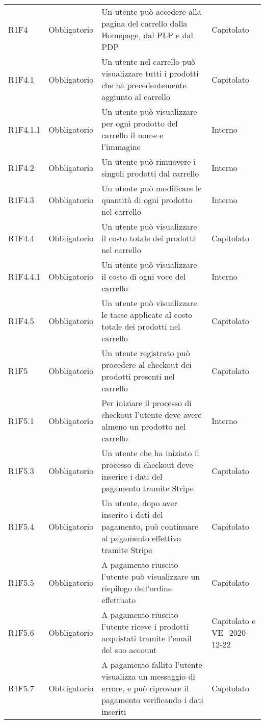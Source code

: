 {\begin{longtable}{C{2.5cm} C{2.8cm} C{6.7cm} C{2.5cm}}
R1F4 & Obbligatorio & Un utente può accedere alla pagina del carrello dalla Homepage, dal PLP e dal PDP & Capitolato \\
R1F4.1 & Obbligatorio & Un utente nel carrello può visualizzare tutti i prodotti che ha precedentemente aggiunto al carrello & Capitolato \\
R1F4.1.1 & Obbligatorio & Un utente può visualizzare per ogni prodotto del carrello il nome e l'immagine & Interno \\
R1F4.2 & Obbligatorio & Un utente può rimuovere i singoli prodotti dal carrello & Interno \\
R1F4.3 & Obbligatorio & Un utente può modificare le quantità di ogni prodotto nel carrello & Interno \\
R1F4.4 & Obbligatorio & Un utente può visualizzare il costo totale dei prodotti nel carrello & Capitolato \\
R1F4.4.1 & Obbligatorio & Un utente può visualizzare il costo di ogni voce del carrello & Interno \\
R1F4.5 & Obbligatorio & Un utente può visualizzare le tasse applicate al costo totale dei prodotti nel carrello & Capitolato \\


R1F5 & Obbligatorio & Un utente registrato può procedere al checkout dei prodotti presenti nel carrello & Capitolato \\
R1F5.1 & Obbligatorio & Per iniziare il processo di checkout l'utente deve avere almeno un prodotto nel carrello & Interno \\
R1F5.3 & Obbligatorio & Un utente che ha iniziato il processo di checkout deve inserire i dati del pagamento tramite Stripe & Capitolato \\
R1F5.4 & Obbligatorio & Un utente, dopo aver inserito i dati del pagamento, può continuare al pagamento effettivo tramite Stripe & Capitolato \\
R1F5.5 & Obbligatorio & A pagamento riuscito l'utente può visualizzare un riepilogo dell'ordine effettuato & Capitolato \\
R1F5.6 & Obbligatorio & A pagamento riuscito l'utente riceve i prodotti acquistati tramite l'email del suo account & Capitolato e VE\_2020-12-22 \\
R1F5.7 & Obbligatorio & A pagamento fallito l'utente visualizza un messaggio di errore, e può riprovare il pagamento verificando i dati inseriti & Capitolato \\


\end{longtable}}
